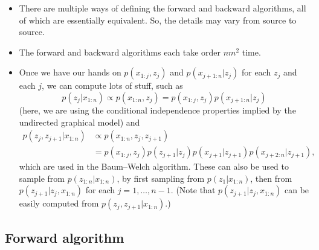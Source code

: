 \documentclass[12pt]{article}
\begin{document}
\begin{itemize}
\begin{enumerate}
\end{enumerate}
\item There are multiple ways of defining the forward and backward algorithms, all of which are essentially equivalent. So, the details may vary from source to source.
\item The forward and backward algorithms each take order $n m^2$ time.
\item Once we have our hands on $p(x_{1:j},z_j)$ and $p(x_{j+1:n} | z_j)$ for each $z_j$ and each $j$, we can compute lots of stuff, such as
$$p(z_j | x_{1:n}) \propto p(x_{1:n},z_j) = p(x_{1:j},z_j) p(x_{j+1:n} | z_j)$$
(here, we are using the conditional independence properties implied by the undirected graphical model) and
\begin{align*}
p(z_j,z_{j+1} | x_{1:n}) &\propto p(x_{1:n},z_j,z_{j+1}) \\
& = p(x_{1:j},z_j) p(z_{j+1} | z_j) p(x_{j+1} | z_{j+1}) p(x_{j+2:n} | z_{j+1}),
\end{align*}
which are used in the Baum--Welch algorithm. These can also be used to sample from $p(z_{1:n} |x_{1:n})$, by first sampling from $p(z_1 | x_{1:n})$, then from $p(z_{j+1} | z_j,x_{1:n})$ for each $j = 1,\ldots,n -1$. (Note that $p(z_{j+1} | z_j,x_{1:n})$ can be easily computed from $p(z_j,z_{j+1} | x_{1:n})$.)
\end{itemize}


\subsection{Forward algorithm}
\end{document}
